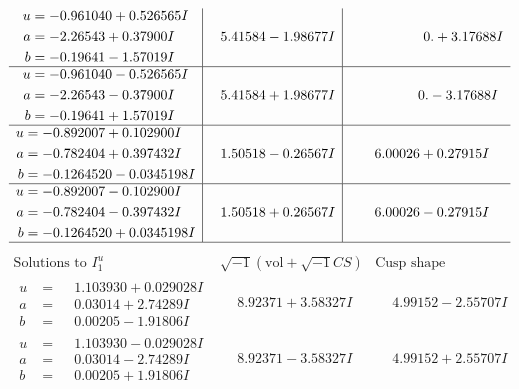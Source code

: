 \documentclass[1p]{elsarticle_modified}
\theoremstyle{definition}
\newcommand{\I}{\sqrt{-1}}
\begin{document}
$$\begin{array}{c|c|c}
\begin{aligned}
u &= -0.961040 + 0.526565 I \\
a &= -2.26543 + 0.37900 I \\
b &= -0.19641 - 1.57019 I\end{aligned}
 & \phantom{-}5.41584 - 1.98677 I & \phantom{-0.000000 -}0. + 3.17688 I \\ \hline\begin{aligned}
u &= -0.961040 - 0.526565 I \\
a &= -2.26543 - 0.37900 I \\
b &= -0.19641 + 1.57019 I\end{aligned}
 & \phantom{-}5.41584 + 1.98677 I & \phantom{-0.000000 } 0. - 3.17688 I \\ \hline\begin{aligned}
u &= -0.892007 + 0.102900 I \\
a &= -0.782404 + 0.397432 I \\
b &= -0.1264520 - 0.0345198 I\end{aligned}
 & \phantom{-}1.50518 - 0.26567 I & \phantom{-}6.00026 + 0.27915 I \\ \hline\begin{aligned}
u &= -0.892007 - 0.102900 I \\
a &= -0.782404 - 0.397432 I \\
b &= -0.1264520 + 0.0345198 I\end{aligned}
 & \phantom{-}1.50518 + 0.26567 I & \phantom{-}6.00026 - 0.27915 I\\
 \hline 
 \end{array}$$\newpage$$\begin{array}{c|c|c}  
\text{Solutions to }I^u_{1}& \I (\text{vol} + \sqrt{-1}CS) & \text{Cusp shape}\\
 \hline 
\begin{aligned}
u &= \phantom{-}1.103930 + 0.029028 I \\
a &= \phantom{-}0.03014 + 2.74289 I \\
b &= \phantom{-}0.00205 - 1.91806 I\end{aligned}
 & \phantom{-}8.92371 + 3.58327 I & \phantom{-}4.99152 - 2.55707 I \\ \hline\begin{aligned}
u &= \phantom{-}1.103930 - 0.029028 I \\
a &= \phantom{-}0.03014 - 2.74289 I \\
b &= \phantom{-}0.00205 + 1.91806 I\end{aligned}
 & \phantom{-}8.92371 - 3.58327 I & \phantom{-}4.99152 + 2.55707 I \\ \hline\begin{aligned}

\end{aligned}
\end{array}$$
\end{document}
